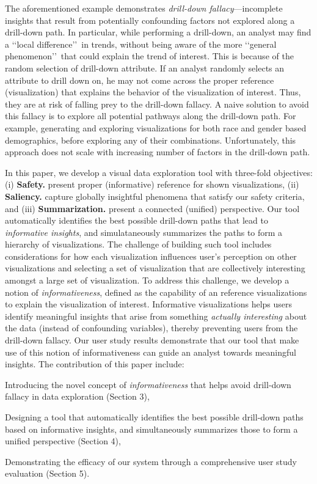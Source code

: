 The aforementioned example demonstrates \emph{drill-down fallacy}---incomplete insights that result from potentially confounding factors not explored along a drill-down path. In particular, while performing a drill-down, an analyst may find a \lq\lq local difference\rq\rq\ in trends, without being aware of the more \lq\lq general phenomenon\rq\rq\ that could explain the trend of interest. This is because of the random selection of drill-down attribute. If an analyst randomly selects an attribute to drill down on, he may not come across the proper reference (visualization) that explains the behavior of the visualization of interest. Thus, they are at risk of falling prey to the drill-down fallacy. A naive solution to avoid this fallacy is to explore all potential pathways along the drill-down path. For example, generating and exploring visualizations for both race and gender based demographics, before exploring any of their combinations. Unfortunately, this approach does not scale with increasing number of factors in the drill-down path.

In this paper, we develop a visual data exploration tool with three-fold objectives: (i) \textbf{Safety.} present proper (informative) reference for shown visualizations, (ii) \textbf{Saliency.} capture globally insightful phenomena that satisfy our safety criteria, and (iii) \textbf{Summarization.} present a connected (unified) perspective. Our tool automatically identifies the best possible drill-down paths that lead to \emph{informative insights}, and simulataneously summarizes the paths to form a hierarchy of visualizations. The challenge of building such tool includes considerations for how each visualization influences user's perception on other visualizations and selecting a set of visualization that are collectively interesting amongst a large set of visualization. To address this challenge, we develop a notion of \emph{informativeness}, defined as the capability of an reference visualizations to explain the visualization of interest. Informative visualizations helps users identify meaningful insights that arise from something \textit{actually interesting} about the data (instead of confounding variables), thereby preventing users from the drill-down fallacy. Our user study results demonstrate that our tool that make use of this notion of informativeness can guide an analyst towards meaningful insights. The contribution of this paper include:
\begin{denselist}
\item Introducing the novel concept of \emph{informativeness} that helps avoid drill-down fallacy in data exploration (Section 3),
\item Designing a tool that automatically identifies the best possible drill-down paths based on informative insights, and simultaneously summarizes those to form a unified perspective (Section 4),
\item Demonstrating the efficacy of our system through a comprehensive user study evaluation (Section 5).
\end{denselist}

